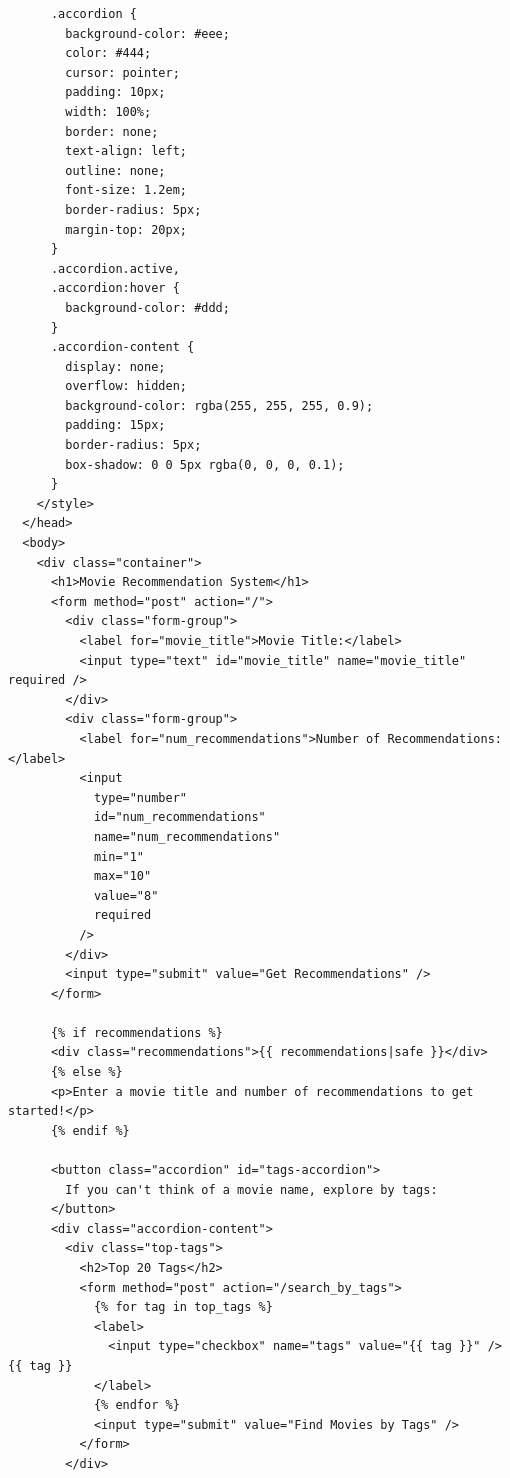 \documentclass[conference]{IEEEtran}
\begin{document}
\begin{lstlisting}
      .accordion {
        background-color: #eee;
        color: #444;
        cursor: pointer;
        padding: 10px;
        width: 100%;
        border: none;
        text-align: left;
        outline: none;
        font-size: 1.2em;
        border-radius: 5px;
        margin-top: 20px;
      }
      .accordion.active,
      .accordion:hover {
        background-color: #ddd;
      }
      .accordion-content {
        display: none;
        overflow: hidden;
        background-color: rgba(255, 255, 255, 0.9);
        padding: 15px;
        border-radius: 5px;
        box-shadow: 0 0 5px rgba(0, 0, 0, 0.1);
      }
    </style>
  </head>
  <body>
    <div class="container">
      <h1>Movie Recommendation System</h1>
      <form method="post" action="/">
        <div class="form-group">
          <label for="movie_title">Movie Title:</label>
          <input type="text" id="movie_title" name="movie_title" required />
        </div>
        <div class="form-group">
          <label for="num_recommendations">Number of Recommendations:</label>
          <input
            type="number"
            id="num_recommendations"
            name="num_recommendations"
            min="1"
            max="10"
            value="8"
            required
          />
        </div>
        <input type="submit" value="Get Recommendations" />
      </form>

      {% if recommendations %}
      <div class="recommendations">{{ recommendations|safe }}</div>
      {% else %}
      <p>Enter a movie title and number of recommendations to get started!</p>
      {% endif %}

      <button class="accordion" id="tags-accordion">
        If you can't think of a movie name, explore by tags:
      </button>
      <div class="accordion-content">
        <div class="top-tags">
          <h2>Top 20 Tags</h2>
          <form method="post" action="/search_by_tags">
            {% for tag in top_tags %}
            <label>
              <input type="checkbox" name="tags" value="{{ tag }}" /> {{ tag }}
            </label>
            {% endfor %}
            <input type="submit" value="Find Movies by Tags" />
          </form>
        </div>


\end{lstlisting}
\end{document}
